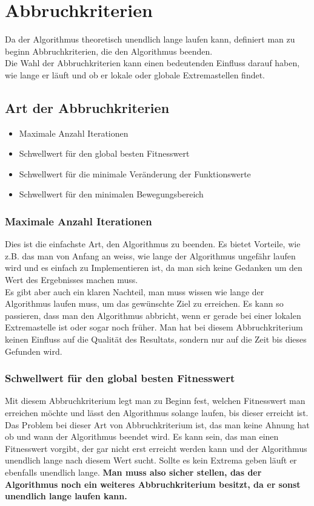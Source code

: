 \section{Abbruchkriterien}

Da der Algorithmus theoretisch unendlich lange laufen kann, definiert man zu beginn Abbruchkriterien, die den Algorithmus beenden.\\
Die Wahl der Abbruchkriterien kann einen bedeutenden Einfluss darauf haben, wie lange er läuft und ob er lokale oder globale Extremastellen findet.

\subsection{Art der Abbruchkriterien}

\begin{itemize}
\item Maximale Anzahl Iterationen
\item Schwellwert für den global besten Fitnesswert
\item Schwellwert für die minimale Veränderung der Funktionswerte 
\item Schwellwert für den minimalen Bewegungsbereich
\end{itemize}

\subsubsection{Maximale Anzahl Iterationen}
Dies ist die einfachste Art, den Algorithmus zu beenden. Es bietet Vorteile, wie z.B. das man von Anfang an weiss, wie lange der Algorithmus ungefähr laufen wird und es einfach zu Implementieren ist, da man sich keine Gedanken um den Wert des Ergebnisses machen muss. \\
Es gibt aber auch ein klaren Nachteil, man muss wissen wie lange der Algorithmus laufen muss, um das gewünschte Ziel zu erreichen. Es kann so passieren, dass man den Algorithmus abbricht, wenn er gerade bei einer lokalen Extremastelle ist oder sogar noch früher. Man hat bei diesem Abbruchkriterium keinen Einfluss auf die Qualität des Resultats, sondern nur auf die Zeit bis dieses Gefunden wird.

\subsubsection{Schwellwert für den global besten Fitnesswert}
Mit diesem Abbruchkriterium legt man zu Beginn fest, welchen Fitnesswert man erreichen möchte und lässt den Algorithmus solange laufen, bis dieser erreicht ist.\\
Das Problem bei dieser Art von Abbruchkriterium ist, das man keine Ahnung hat ob und wann der Algorithmus beendet wird. Es kann sein, das man einen Fitnesswert vorgibt, der gar nicht erst erreicht werden kann und der Algorithmus unendlich lange nach diesem Wert sucht. Sollte es kein Extrema geben läuft er ebenfalls unendlich lange. \textbf{Man muss also sicher stellen, das der Algorithmus noch ein weiteres Abbruchkriterium besitzt, da er sonst unendlich lange laufen kann.}

